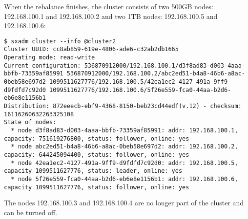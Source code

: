 When the rebalance finishes, the cluster consists of two 500GB nodes:
192.168.100.1 and 192.168.100.2 and two 1TB nodes: 192.168.100.5 and
192.168.100.6:
\begin{lstlisting}
$ sxadm cluster --info @cluster2
Cluster UUID: cc8ab859-619e-4806-ade6-c32ab2db1665
Operating mode: read-write
Current configuration: 536870912000/192.168.100.1/d3f8ad83-d003-4aaa-bbfb-73359af85991 536870912000/192.168.100.2/abc2ed51-b4a8-46b6-a8ac-0beb58e697d2 1099511627776/192.168.100.5/42ea1ec2-4127-491a-9ff9-d9fdfd7c92d0 1099511627776/192.168.100.6/5f26e559-fca0-44aa-b2d6-eb6e8e1156b1
Distribution: 872eeecb-ebf9-4368-8150-beb23cd44edf(v.12) - checksum: 16116260632263325108
State of nodes:
  * node d3f8ad83-d003-4aaa-bbfb-73359af85991: addr: 192.168.100.1, capacity: 751619276800, status: follower, online: yes
  * node abc2ed51-b4a8-46b6-a8ac-0beb58e697d2: addr: 192.168.100.2, capacity: 644245094400, status: follower, online: yes
  * node 42ea1ec2-4127-491a-9ff9-d9fdfd7c92d0: addr: 192.168.100.5, capacity 1099511627776, status: leader, online: yes
  * node 5f26e559-fca0-44aa-b2d6-eb6e8e1156b1: addr: 192.168.100.6, capacity 1099511627776, status: follower, online: yes
\end{lstlisting}
The nodes 192.168.100.3 and 192.168.100.4 are no longer part of the cluster
and can be turned off.

